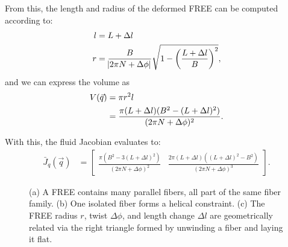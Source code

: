 From this, the length and radius of the deformed FREE can be computed according to:
\begin{align}
    l &= L + \Delta l \label{eq:l} \\
	r &= \frac{B}{\abs{2 \pi N + \Delta \phi}} \sqrt{1 - \left( \frac{L+\Delta l}{B} \right)^2}, \label{eq:r}
\end{align}
and we can express the volume as
\begin{align}
	V(\vec{q}) &= \pi r^2 l \notag \\ 
	&= \frac{\pi (L+\Delta l) (B^2 - (L+\Delta l)^2)}{(2 \pi N + \Delta \phi)^2}  \label{eq:V}.
\end{align}

With this, the fluid Jacobian evaluates to:
\begin{align}
    \bar{J}_q (\vec{q})
    &= \begin{bmatrix} 
		        \frac{\pi \left( B^2 - 3(L + \Delta l)^2 \right)}{(2 \pi N + \Delta \phi)^2} & \frac{2 \pi (L+\Delta l) \left( (L+\Delta l)^2 - B^2 \right)}{(2 \pi N + \Delta \phi)^3}
		\end{bmatrix}.    \label{eq:Jv}
\end{align}


\begin{figure}
    \centering
    \caption{(a) A FREE contains many parallel fibers, all part of the same fiber family. (b) One isolated fiber forms a helical constraint. (c) The FREE radius $r$, twist $\Delta \phi$, and length change $\Delta l$ are geometrically related via the right triangle formed by unwinding a fiber and laying it flat.}
    \label{fig:fiber}
\end{figure}







